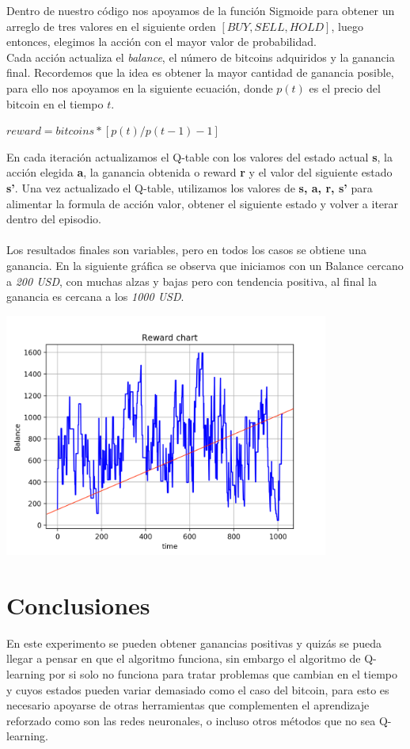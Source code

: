 \documentclass[12pt,letterpaper]{article}
\begin{document}
{Dentro de nuestro código nos apoyamos de la función Sigmoide para obtener un arreglo de tres valores en el siguiente orden $[BUY, SELL,  HOLD]$, luego entonces, elegimos la acción con el mayor valor de probabilidad.\\
Cada acción actualiza el \textit{balance}, el número de bitcoins adquiridos y la ganancia final. Recordemos que la idea es obtener la mayor cantidad de ganancia posible, para ello nos apoyamos en la siguiente ecuación, donde $p(t)$ es el precio del bitcoin en el tiempo $t$.
\begin{center}
$reward = bitcoins*[p(t)/p(t-1)-1]$
\end{center}
En cada iteración actualizamos el Q-table con los valores del estado actual \textbf{s}, la acción elegida \textbf{a}, la ganancia obtenida o reward \textbf{r } y el valor del siguiente estado \textbf{s'}.
Una vez actualizado el Q-table, utilizamos los valores de \textbf{s, a, r, s'} para alimentar la formula de acción valor, obtener el siguiente estado y volver a iterar dentro del episodio.\\
\\
Los resultados  finales son variables, pero en todos los casos se obtiene una ganancia. En la siguiente gráfica se observa que iniciamos con un Balance cercano a \textit{200 USD}, con muchas alzas y bajas pero con tendencia positiva, al final la ganancia es cercana a los \textit{1000 USD}.


\begin{center}
\includegraphics[width=0.8\textwidth]{rewardchart.png}
\end{center}

\section{Conclusiones} 
En este experimento se pueden obtener ganancias positivas y quizás se pueda llegar a pensar en que el algoritmo funciona, sin embargo el algoritmo de Q-learning por si solo no funciona para tratar problemas que cambian en el tiempo y cuyos estados pueden variar demasiado como el caso del bitcoin, para esto es necesario apoyarse de otras herramientas que complementen el aprendizaje reforzado como son las redes neuronales, o incluso otros métodos que no sea Q-learning.

}
\end{document}

